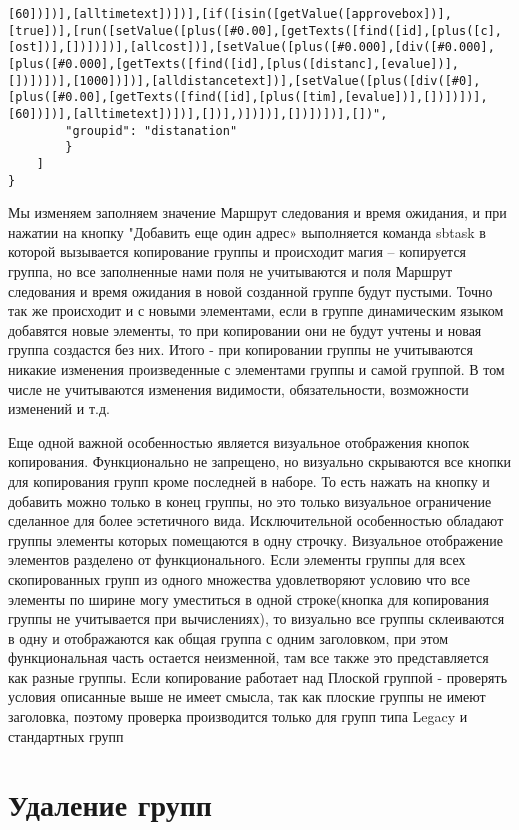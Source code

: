 \documentclass[../index.tex]{subfiles}
\begin{document}
\begin{verbatim}
[60])])],[alltimetext])])],[if([isin([getValue([approvebox])],[true])],[run([setValue([plus([#0.00],[getTexts([find([id],[plus([c],[ost])],[])])])],[allcost])],[setValue([plus([#0.000],[div([#0.000],[plus([#0.000],[getTexts([find([id],[plus([distanc],[evalue])],[])])])],[1000])])],[alldistancetext])],[setValue([plus([div([#0],[plus([#0.00],[getTexts([find([id],[plus([tim],[evalue])],[])])])], [60])])],[alltimetext])])],[])],)])])],[])])])],[])",
        "groupid": "distanation"
        }
    ]
}
\end{verbatim}
Мы изменяем заполняем значение Маршрут следования и время ожидания, и при нажатии на кнопку "Добавить еще один адрес» выполняется команда sbtask в которой вызывается копирование группы и происходит магия -- копируется группа, но все заполненные нами поля не учитываются и поля Маршрут следования и время ожидания в новой созданной группе будут пустыми. Точно так же происходит и с новыми элементами, если в группе динамическим языком добавятся новые элементы, то при копировании они не будут учтены и новая группа создастся без них. 
Итого -  при копировании группы не учитываются никакие изменения произведенные с элементами группы и самой группой. В том числе не учитываются изменения видимости, обязательности, возможности изменений и т.д. 

Еще одной важной особенностью является визуальное отображения кнопок копирования. Функционально не запрещено, но визуально скрываются все кнопки для копирования групп кроме последней в наборе. То есть нажать на кнопку и добавить можно только в конец группы, но это только визуальное ограничение сделанное для более эстетичного вида. 
Исключительной особенностью обладают группы элементы которых помещаются в одну строчку. Визуальное отображение элементов разделено от функционального. Если элементы группы для всех скопированных групп из одного множества удовлетворяют условию что все элементы по ширине могу уместиться в одной строке(кнопка для копирования группы не учитывается при вычислениях), то визуально все группы склеиваются в одну и отображаются как общая группа с одним заголовком, при этом функциональная часть остается неизменной, там все также это представляется как разные группы.
Если копирование работает над Плоской группой - проверять условия описанные выше не имеет смысла, так как плоские группы не имеют заголовка, поэтому проверка производится только для групп типа Legacy и стандартных групп
\section{Удаление групп}
\end{document}
